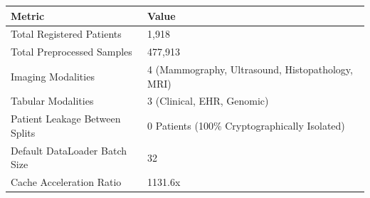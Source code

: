 \begin{tabular}{ll}
\toprule
Metric & Value \\
\midrule
Total Registered Patients & 1,918 \\
Total Preprocessed Samples & 477,913 \\
Imaging Modalities & 4 (Mammography, Ultrasound, Histopathology, MRI) \\
Tabular Modalities & 3 (Clinical, EHR, Genomic) \\
Patient Leakage Between Splits & 0 Patients (100\% Cryptographically Isolated) \\
Default DataLoader Batch Size & 32 \\
Cache Acceleration Ratio & 1131.6x \\
\bottomrule
\end{tabular}
